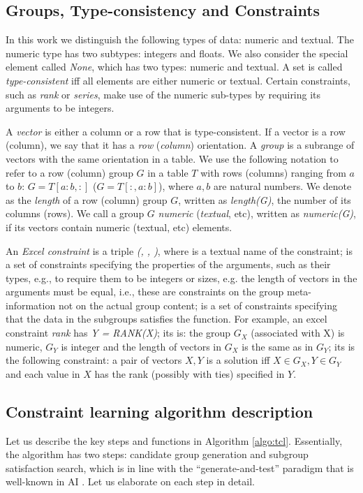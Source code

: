 \documentclass{ecai}
\begin{document}
\subsection{Groups, Type-consistency and Constraints}
In this work we distinguish the following types of data: numeric and textual. The numeric type has two subtypes: integers and floats. We also consider the special element called \textit{None}, which has two types: numeric and textual. A set is called \textit{type-consistent} iff all elements are either numeric or textual. Certain constraints, such as \textit{rank} or \textit{series}, make use of the numeric sub-types by requiring its arguments to be integers.

A \textit{vector} is either a column or a row that is type-consistent. If a vector is a row (column), we say that it has a \textit{row} (\textit{column}) orientation. A \textit{group} is a subrange of vectors with the same orientation in a table. We use the following notation to refer to a row (column) group $G$ in a table $T$ with rows (columns) ranging from $a$ to $b$: $G = T[a{:}b,:]$ ($G = T[{:},a{:}b]$), where $a,b$ are natural numbers. We denote as the \textit{length} of a row (column) group $G$, written as \textit{length(G)}, the number of its columns (rows). We call a group $G$ \textit{numeric} (\textit{textual}, etc), written as \textit{numeric(G)}, if its vectors contain numeric (textual, etc) elements.

An \textit{Excel constraint} is a triple \textit{(\CName, \CSignature, \CFunction)}, where \textit{\CName} is a textual name of the constraint; \textit{\CSignature} is a set of constraints specifying the properties of the arguments, such as their types, e.g., to require them to be integers or sizes, e.g. the length of vectors in the arguments must be equal, i.e., these are constraints on the group meta-information not on the actual group content; \textit{\CFunction} is a set of constraints specifying that the data in the subgroups satisfies the function. For example, an excel constraint \textit{rank} has \CName \textit{Y = RANK(X)}; its \CSignature is: the group $G_X$ (associated with X) is numeric, $G_Y$ is integer and the length of vectors in $G_X$ is the same as in $G_Y$; its \CFunction is the following constraint: a pair of vectors $X,Y$ is a solution iff $X \in G_X, Y \in G_Y$ and each value in $X$ has the rank (possibly with ties) specified in $Y$.

\subsection{Constraint learning algorithm description}
Let us describe the key steps and functions in Algorithm \ref{algo:tcl}. Essentially, the algorithm has two steps: candidate group generation and subgroup satisfaction search, which is in line with the ``generate-and-test'' paradigm that is well-known in AI \cite{whaisasp}. Let us elaborate on each step in detail.
\end{document}
